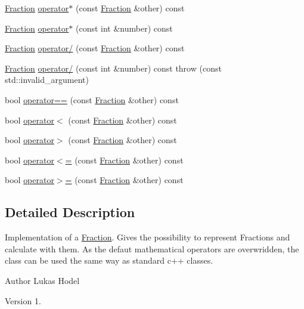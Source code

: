\begin{DoxyCompactItemize}
\item 
\hyperlink{classFraction}{Fraction} \hyperlink{classFraction_ab742d856770b1ec746aedf6382ee35df}{operator$\ast$} (const \hyperlink{classFraction}{Fraction} \&other) const 
\item 
\hyperlink{classFraction}{Fraction} \hyperlink{classFraction_adfde5a22f3fe5b0b70c3008162ca014b}{operator$\ast$} (const int \&number) const 
\item 
\hyperlink{classFraction}{Fraction} \hyperlink{classFraction_a572eedd14d4ec9e42a65130029aac360}{operator/} (const \hyperlink{classFraction}{Fraction} \&other) const 
\item 
\hyperlink{classFraction}{Fraction} \hyperlink{classFraction_a81c6eb908f902b21dedcbdf50341d4f4}{operator/} (const int \&number) const   throw (const std\-::invalid\-\_\-argument)
\item 
bool \hyperlink{classFraction_a6c59460c8a1694a99173f1546ee5ffe5}{operator==} (const \hyperlink{classFraction}{Fraction} \&other) const 
\item 
bool \hyperlink{classFraction_ac846064d1566945f66bd7bd0bc6708cf}{operator$<$} (const \hyperlink{classFraction}{Fraction} \&other) const 
\item 
bool \hyperlink{classFraction_a447af586d29a0f0175b608262415698b}{operator$>$} (const \hyperlink{classFraction}{Fraction} \&other) const 
\item 
bool \hyperlink{classFraction_a04fbb8fb0170728e8a0b9c1efe0a9c62}{operator$<$=} (const \hyperlink{classFraction}{Fraction} \&other) const 
\item 
bool \hyperlink{classFraction_a178bbf6662c0ee3bf7e275c65355278a}{operator$>$=} (const \hyperlink{classFraction}{Fraction} \&other) const 
\end{DoxyCompactItemize}


\subsection{Detailed Description}
Implementation of a \hyperlink{classFraction}{Fraction}. Gives the possibility to represent Fractions and calculate with them. As the defaut mathematical operators are overwridden, the class can be used the same way as standard c++ classes.

\begin{DoxyAuthor}{Author}
Lukas Hodel 
\end{DoxyAuthor}
\begin{DoxyVersion}{Version}
1. 
\end{DoxyVersion}


